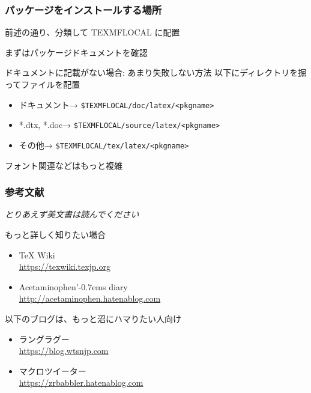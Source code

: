 \begin{frame}
	\frametitle{パッケージをインストールする場所}
	前述の通り、分類して TEXMFLOCAL に配置
	
	まずはパッケージドキュメントを確認
	
	\begin{block}{ドキュメントに記載がない場合: あまり失敗しない方法}
		以下にディレクトリを掘ってファイルを配置
		\begin{itemize}
			\small
			\item ドキュメント→ \texttt{\$TEXMFLOCAL/doc/latex/<pkgname>}
			\item *.dtx, *.doc→ \texttt{\$TEXMFLOCAL/source/latex/<pkgname>}
			\item その他→ \texttt{\$TEXMFLOCAL/tex/latex/<pkgname>}
		\end{itemize}
	\end{block}
	
	フォント関連などはもっと複雑
\end{frame}

\begin{frame}
	\frametitle{参考文献}
	\emph{とりあえず美文書は読んでください}
	
	\begin{block}{もっと詳しく知りたい場合}
		\begin{itemize}
			\item {\TeX} Wiki\\\url{https://texwiki.texjp.org}
			\item Acetaminophen'{\kern-0.7em}s diary\\\url{http://acetaminophen.hatenablog.com}
		\end{itemize}
	\end{block}
	
	\bgroup\footnotesize
	\begin{block}{以下のブログは、もっと沼にハマりたい人向け}
		\begin{itemize}
			\item ラングラグー\\\url{https://blog.wtsnjp.com}
			\item マクロツイーター\\\url{https://zrbabbler.hatenablog.com}
		\end{itemize}
	\end{block}
	\egroup
\end{frame}

